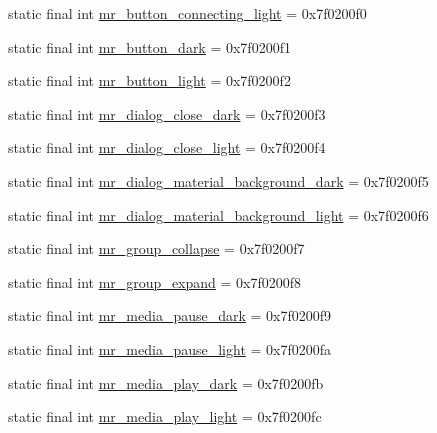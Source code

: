 \begin{CompactItemize}
\item 
static final int \hyperlink{classandroid_1_1support_1_1v4_1_1_r_1_1drawable_230fccf5b599489ef6e1103d7a5da321}{mr\_\-button\_\-connecting\_\-light} = 0x7f0200f0
\item 
static final int \hyperlink{classandroid_1_1support_1_1v4_1_1_r_1_1drawable_7949ea929a876cc58cdf1203b6999dee}{mr\_\-button\_\-dark} = 0x7f0200f1
\item 
static final int \hyperlink{classandroid_1_1support_1_1v4_1_1_r_1_1drawable_aca725a5536e5a673f516912ec0d2cd0}{mr\_\-button\_\-light} = 0x7f0200f2
\item 
static final int \hyperlink{classandroid_1_1support_1_1v4_1_1_r_1_1drawable_3dae3ff2638cb3aea347d337a06402fb}{mr\_\-dialog\_\-close\_\-dark} = 0x7f0200f3
\item 
static final int \hyperlink{classandroid_1_1support_1_1v4_1_1_r_1_1drawable_35dc9818c52891b72e8bc58baa7494dd}{mr\_\-dialog\_\-close\_\-light} = 0x7f0200f4
\item 
static final int \hyperlink{classandroid_1_1support_1_1v4_1_1_r_1_1drawable_a8930fb33d5ff2a62e85bb87ad550925}{mr\_\-dialog\_\-material\_\-background\_\-dark} = 0x7f0200f5
\item 
static final int \hyperlink{classandroid_1_1support_1_1v4_1_1_r_1_1drawable_a14faf85494bd5e27ee4758544a1e5dd}{mr\_\-dialog\_\-material\_\-background\_\-light} = 0x7f0200f6
\item 
static final int \hyperlink{classandroid_1_1support_1_1v4_1_1_r_1_1drawable_613950e6f65280aeab4fcb73772a17c6}{mr\_\-group\_\-collapse} = 0x7f0200f7
\item 
static final int \hyperlink{classandroid_1_1support_1_1v4_1_1_r_1_1drawable_647fe49ffaf0c33311de56dcdfb60590}{mr\_\-group\_\-expand} = 0x7f0200f8
\item 
static final int \hyperlink{classandroid_1_1support_1_1v4_1_1_r_1_1drawable_741c344c2b5c7ee00bb24c068350ce08}{mr\_\-media\_\-pause\_\-dark} = 0x7f0200f9
\item 
static final int \hyperlink{classandroid_1_1support_1_1v4_1_1_r_1_1drawable_98faee8c8ffa0c9c4a35d7438d35f82b}{mr\_\-media\_\-pause\_\-light} = 0x7f0200fa
\item 
static final int \hyperlink{classandroid_1_1support_1_1v4_1_1_r_1_1drawable_0a4af57b3fc1313c2a87f59d6e354103}{mr\_\-media\_\-play\_\-dark} = 0x7f0200fb
\item 
static final int \hyperlink{classandroid_1_1support_1_1v4_1_1_r_1_1drawable_f4e143793f79332c19afe8c6868199a8}{mr\_\-media\_\-play\_\-light} = 0x7f0200fc

\end{CompactItemize}
